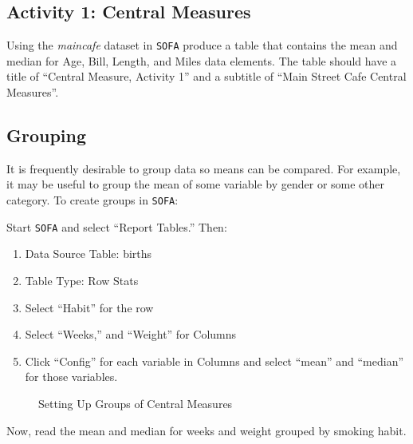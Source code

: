 \subsection{Activity 1: Central Measures} \label{cen:act01}

Using the \textit{maincafe} dataset in \texttt{SOFA} produce a table that contains the mean and median for Age, Bill, Length, and Miles data elements. The table should have a title of ``Central Measure, Activity 1'' and a subtitle of ``Main Street Cafe Central Measures''. 

\subsection{Grouping}

It is frequently desirable to group data so means can be compared. For example, it may be useful to group the mean of some variable by gender or some other category. To create groups in \texttt{SOFA}:

Start \texttt{SOFA} and select ``Report Tables.'' Then:

\begin{enumerate}
  \item Data Source Table: births
  \item Table Type: Row Stats
  \item Select ``Habit'' for the row
  \item Select ``Weeks,'' and ``Weight'' for Columns
  \item Click ``Config'' for each variable in Columns and select ``mean'' and ``median'' for those variables.
\end{enumerate}

\begin{figure}[H]
  \begin{center}
    \caption{Setting Up Groups of Central Measures}
  \end{center}
\end{figure}

Now, read the mean and median for weeks and weight grouped by smoking habit. 

